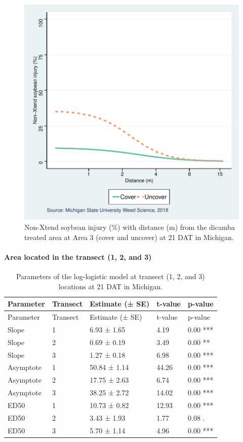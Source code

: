\documentclass[]{article}
\let\oldparagraph\paragraph
\renewcommand{\paragraph}[1]{\oldparagraph{#1}\mbox{}}
\begin{document}
\begin{figure}
\centering
\includegraphics{Report_files/figure-latex/unnamed-chunk-56-1.pdf}
\caption{Non-Xtend soybean injury (\%) with distance (m) from the
dicamba treated area at Area 3 (cover and uncover) at 21 DAT in
Michigan.}
\end{figure}

\pagebreak
\newpage

\paragraph{\texorpdfstring{Area located in the \textbf{transect} (1, 2,
and
3)}{Area located in the transect (1, 2, and 3)}}\label{area-located-in-the-transect-1-2-and-3}

\begin{longtable}[]{@{}lllll@{}}
\caption{Parameters of the log-logistic model at transect (1, 2, and 3)
locations at 21 DAT in Michigan.}\tabularnewline
\toprule
Parameter & Transect & Estimate (± SE) & t-value &
p-value\tabularnewline
\midrule
\endfirsthead
\toprule
Parameter & Transect & Estimate (± SE) & t-value &
p-value\tabularnewline
\midrule
\endhead
Slope & 1 & 6.93 ± 1.65 & 4.19 & 0.00 ***\tabularnewline
Slope & 2 & 0.69 ± 0.19 & 3.49 & 0.00 **\tabularnewline
Slope & 3 & 1.27 ± 0.18 & 6.98 & 0.00 ***\tabularnewline
Asymptote & 1 & 50.84 ± 1.14 & 44.26 & 0.00 ***\tabularnewline
Asymptote & 2 & 17.75 ± 2.63 & 6.74 & 0.00 ***\tabularnewline
Asymptote & 3 & 38.25 ± 2.72 & 14.02 & 0.00 ***\tabularnewline
ED50 & 1 & 10.73 ± 0.82 & 12.93 & 0.00 ***\tabularnewline
ED50 & 2 & 3.43 ± 1.93 & 1.77 & 0.08 .\tabularnewline
ED50 & 3 & 5.70 ± 1.14 & 4.96 & 0.00 ***\tabularnewline
\bottomrule
\end{longtable}
\end{document}
